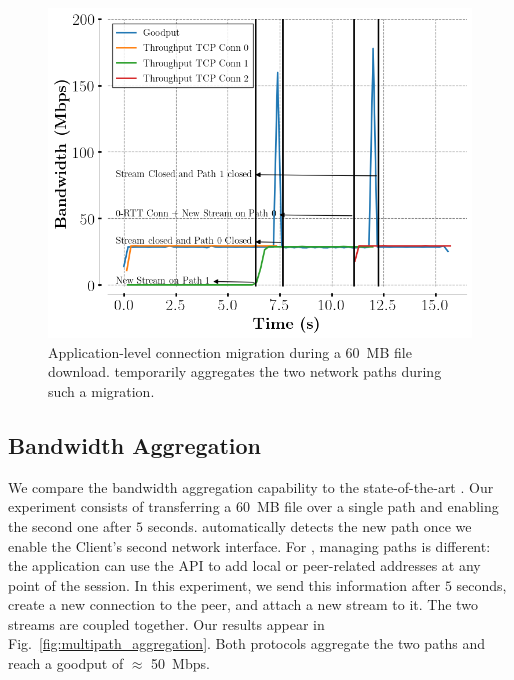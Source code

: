 \begin{figure}[!t]
  \begin{center}
    \includegraphics[width=\columnwidth]{figures/migration.png}
  \end{center}
  \caption{Application-level connection migration during a 60~MB file download.
    \tcpls temporarily aggregates the two network paths during such a migration.}
  \label{fig:conn_migration}
\end{figure}

\subsection{Bandwidth Aggregation}
\label{sec:bwaggr}
We compare the \tcpls bandwidth aggregation capability to the state-of-the-art
\mptcp.
Our experiment consists of transferring a 60~MB file over a single path
and enabling the second one after $5$ seconds. \mptcp automatically detects
the new path once we enable the Client's second network interface. For \tcpls,
managing paths is different: the application can use the API to add local or
peer-related addresses at any point of the session. In this experiment, we send
this information after $5$ seconds, create a new \tcp connection to the peer,
and attach a new stream to it. The two streams are coupled together. Our results
appear in Fig.~\ref{fig:multipath_aggregation}. Both protocols aggregate the
two paths and reach a goodput of $\approx$ 50~Mbps.

